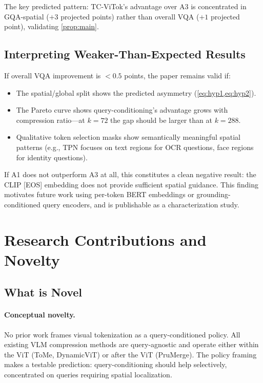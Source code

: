 \documentclass[12pt,a4paper]{article}
\begin{document}
The key predicted pattern: TC-ViTok's advantage over A3 is concentrated in
GQA-spatial ($+3$ projected points) rather than overall VQA ($+1$ projected
point), validating \cref{prop:main}.

\subsection{Interpreting Weaker-Than-Expected Results}

If overall VQA improvement is $< 0.5$ points, the paper remains valid if:
\begin{itemize}[leftmargin=2em]
  \item The spatial/global split shows the predicted asymmetry
    (\cref{eq:hyp1,eq:hyp2}).
  \item The Pareto curve shows query-conditioning's advantage grows with
    compression ratio---at $k = 72$ the gap should be larger than at $k = 288$.
  \item Qualitative token selection masks show semantically meaningful spatial
    patterns (e.g., TPN focuses on text regions for OCR questions, face regions
    for identity questions).
\end{itemize}

If A1 does not outperform A3 at all, this constitutes a clean negative result:
the CLIP [EOS] embedding does not provide sufficient spatial guidance. This
finding motivates future work using per-token BERT embeddings or
grounding-conditioned query encoders, and is publishable as a characterization
study.

\section{Research Contributions and Novelty}
\label{sec:contributions}

\subsection{What is Novel}

\paragraph{Conceptual novelty.}
No prior work frames visual tokenization as a query-conditioned policy. All
existing VLM compression methods are query-agnostic and operate either within the
ViT (ToMe, DynamicViT) or after the ViT (PruMerge). The policy framing makes a
testable prediction: query-conditioning should help selectively, concentrated on
queries requiring spatial localization.
\end{document}
